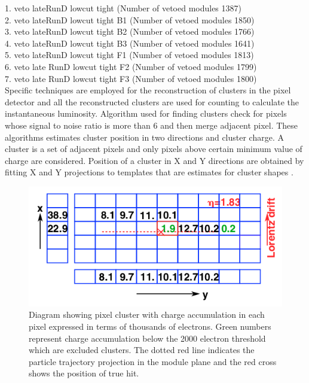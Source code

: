 1. veto lateRunD lowcut tight   (Number of vetoed modules 1387) \\
2. veto lateRunD lowcut tight B1 (Number of vetoed modules 1850)\\
3. veto lateRunD lowcut tight B2 (Number of vetoed modules 1766)\\
4. veto lateRunD lowcut tight B3 (Number of vetoed modules 1641)\\
5. veto lateRunD lowcut tight F1 (Number of vetoed modules 1813)\\
6. veto late RunD lowcut tight F2 (Number of vetoed modules 1799)\\
7. veto late RunD lowcut tight F3 (Number of vetoed modules 1800)\\

Specific techniques are employed for the reconstruction of clusters in the pixel detector and all the reconstructed clusters are used for counting to calculate the instantaneous luminosity. Algorithm used for finding clusters check for pixels whose signal to noise ratio is more than 6 and then merge adjacent pixel. These algorithms estimates cluster position in two directions and cluster charge. A cluster is a set of adjacent pixels and only pixels above certain minimum value of charge are considered. Position of a cluster in X and Y directions are obtained by fitting X and Y projections to templates that are estimates for cluster shapes \cite{Chatrchyan:2014fea}. \\


\begin{figure}[H]
  \centering
  \includegraphics[width=0.6\columnwidth]{./pixel_reco.png}
  \caption{ \onehalfspacing Diagram showing pixel cluster with charge accumulation in each pixel expressed in terms of thousands of electrons. Green numbers represent charge accumulation below the 2000 electron threshold which are excluded clusters. The dotted red line indicates the particle trajectory projection in the module plane and the red cross shows the position of true hit.}
  \label{fig:CMS}
\end{figure}








